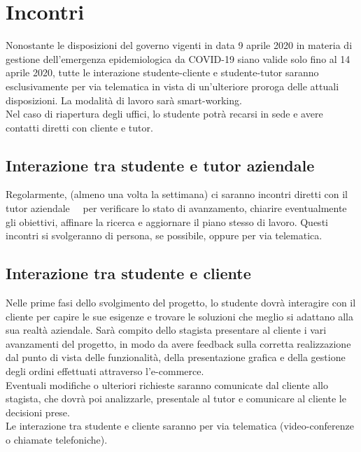 \section*{Incontri}
Nonostante le disposizioni del governo vigenti in data 9 aprile 2020 in materia di gestione dell'emergenza epidemiologica da COVID-19 siano valide solo fino al 14 aprile 2020, tutte le interazione studente-cliente e studente-tutor saranno esclusivamente per via telematica in vista di un'ulteriore proroga delle attuali disposizioni. La modalità di lavoro sarà smart-working. \\
Nel caso di riapertura degli uffici, lo studente potrà recarsi in sede e avere contatti diretti con cliente e tutor.

\subsection*{Interazione tra studente e tutor aziendale}
Regolarmente, (almeno una volta la settimana) ci saranno incontri diretti con il tutor aziendale \nomeTutorAziendale\ \cognomeTutorAziendale\ per verificare lo stato di avanzamento, chiarire eventualmente gli obiettivi, affinare la ricerca e aggiornare il piano stesso di lavoro. Questi incontri si svolgeranno di persona, se possibile, oppure per via telematica.

\subsection*{Interazione tra studente e cliente}
Nelle prime fasi dello svolgimento del progetto, lo studente dovrà interagire con il cliente per capire le sue esigenze e trovare le soluzioni che meglio si adattano alla sua realtà aziendale. Sarà compito dello stagista presentare al cliente i vari avanzamenti del progetto, in modo da avere feedback sulla corretta realizzazione dal punto di vista delle funzionalità, della presentazione grafica e della gestione degli ordini effettuati attraverso l'e-commerce. \\
Eventuali modifiche o ulteriori richieste saranno comunicate dal cliente allo stagista, che dovrà poi analizzarle, presentale al tutor e comunicare al cliente le decisioni prese. \\
Le interazione tra studente e cliente saranno per via telematica (video-conferenze o chiamate telefoniche).